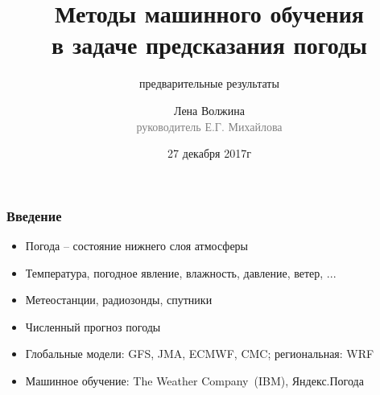 \documentclass{beamer}
\begin{document}
\title{Методы машинного обучения \\в задаче предсказания погоды}
\subtitle{предварительные результаты}
\author{Лена Волжина\\{\footnotesize\textcolor{gray}{руководитель Е.Г. Михайлова}}}
\date{27 декабря 2017г}
\frame{\titlepage}

\begin{frame}\frametitle{Введение}
\begin{itemize}
    \item Погода -- состояние нижнего слоя атмосферы %
    
    \item Температура, погодное явление, влажность, давление, ветер, ...
    
    \item Метеостанции, радиозонды, спутники
    
    \item Численный прогноз погоды %
    
    \item Глобальные модели: GFS, JMA, ECMWF, CMC; региональная: WRF
    
    \item Машинное обучение: The Weather Company~(IBM), Яндекс.Погода
    
\end{itemize}
\end{frame}


\end{document}
